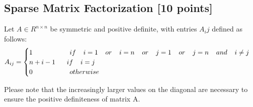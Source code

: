 \documentclass[unicode,11pt,a4paper,oneside,numbers=endperiod,openany]{scrartcl}
\begin{document}
\subsection{Sparse Matrix Factorization [10 points]}
{Let $A \in R^{n\times n}$ be symmetric and positive definite, with entries $A_ij$ defined as follows:}\\
\begin{equation}
A_{ij}=
\begin{cases}
    1 \hspace{55px} if \hspace{11px}i = 1 \hspace{11px} or \hspace{11px} i=n \hspace{11px} or \hspace{11px} j=1 \hspace{11px} or \hspace{11px} j=n \hspace{11px} and \hspace{11px} i\neq j \\
    n + i - 1 \hspace{17px} if \hspace{11px} i=j\\
    0 \hspace{55px} otherwise
\end{cases}
\end{equation}

{Please note that the increasingly larger values on the diagonal are necessary to ensure the positive definiteness of
matrix A.}\\
\end{document}
